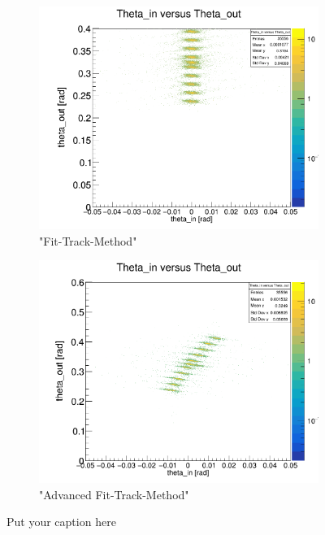 \documentclass[12pt, letterpaper]{article}
\begin{document}
\begin{figure}[!htbp]
\begin{subfigure}{.5\textwidth}
  \label{fig:sub-second}
\end{subfigure}
\begin{subfigure}{.5\textwidth}
  \centering
  \includegraphics[width=.9\linewidth]{plot_imgs/theta_in_theta_out_fit.png} 
  \caption{"Fit-Track-Method"}
  \label{fig:sub-second}
\end{subfigure}
\begin{subfigure}{.5\textwidth}
  \centering
  \includegraphics[width=.9\linewidth]{plot_imgs/theta_in_theta_out_last.png} 
  \caption{"Advanced Fit-Track-Method"}
  \label{fig:sub-second}
\end{subfigure}
\caption{Put your caption here}
\label{fig:fig}
\end{figure}
\FloatBarrier
\clearpage
\end{document}
